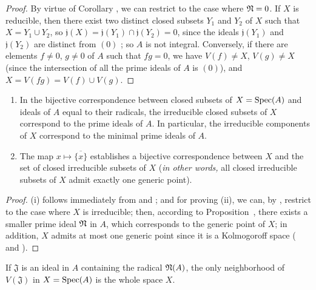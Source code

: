 \begin{proof}
\label{proof-I.1.1.13}
By virtue of Corollary , we can restrict to the case where $\mathfrak{N}=0$.
If $X$ is reducible, then there exist two distinct closed subsets $Y_1$ and $Y_2$ of $X$ such that $X=Y_1\cup Y_2$, so $\mathfrak{j}(X)=\mathfrak{j}(Y_1)\cap\mathfrak{j}(Y_2)=0$, since the ideals $\mathfrak{j}(Y_1)$ and $\mathfrak{j}(Y_2)$ are distinct from $(0)$ ;
so $A$ is not integral.
Conversely, if there are elements $f\neq 0$, $g\neq 0$ of $A$ such that $fg=0$, we have $V(f)\neq X$, $V(g)\neq X$ (since the intersection of all the prime ideals of $A$ is $(0)$), and $X=V(fg)=V(f)\cup V(g)$.
\end{proof}

\begin{corollary}[1.1.14]
\label{I.1.1.14}
\medskip\noindent
\begin{enumerate}
  \item[{\rm(i)}] In the bijective correspondence between closed subsets of $X=\operatorname{Spec}(A)$ and ideals of $A$ equal to their radicals, the irreducible closed subsets of $X$ correspond to the prime ideals of $A$.
    In particular, the irreducible components of $X$ correspond to the minimal prime ideals of $A$.
  \item[{\rm(ii)}] The map $x\mapsto\overline{\{x\}}$ establishes a bijective correspondence between $X$ and the set of closed irreducible subsets of $X$ (\emph{in other words,} all closed irreducible subsets of $X$ admit exactly one generic point).
\end{enumerate}
\end{corollary}

\begin{proof}
\label{proof-I.1.1.14}
(i) follows immediately from  and ;
and for proving (ii), we can, by , restrict to the case where $X$ is irreducible;
then, according to Proposition~, there exists a smaller prime ideal $\mathfrak{N}$ in $A$, which corresponds to the generic point
of $X$;
in addition, $X$ admits at most one generic point since it is a Kolmogoroff space ( and ).
\end{proof}

\begin{proposition}[1.1.15]
\label{I.1.1.15}
If $\mathfrak{J}$ is an ideal in $A$ containing the radical $\mathfrak{N}(A)$, the only
neighborhood of $V(\mathfrak{J})$ in $X=\operatorname{Spec}(A)$ is the whole space $X$.
\end{proposition}


